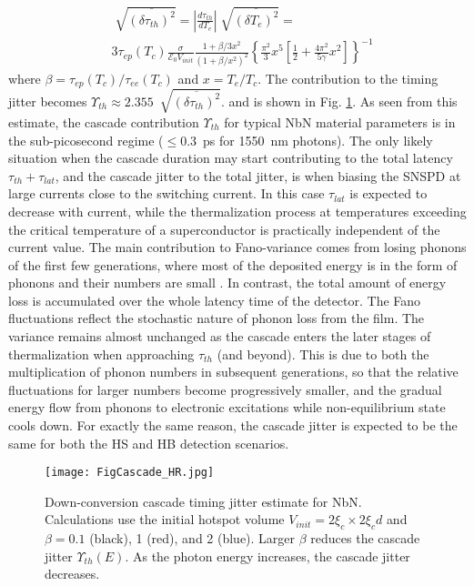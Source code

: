 \documentclass[%
reprint,
 amsmath,amssymb,
aps,
pra,
]{revtex4-1}
\begin{document}
\begin{equation}\label{temperature fluctuations}
\begin{aligned}
&\sqrt[]{\overline{\left(\delta \tau_{th}\right)^2}} = \left|\frac{d\tau_{th}}{dT_e}\right|\sqrt[]{\overline{\left(\delta T_e\right)^2}} = \\
&3\tau_{ep}(T_c)\frac{\sigma}{\mathcal{E}_0 V_{init}}\frac{1 + \beta/3x^2}{\left(1 + \beta/x^2\right)^2}\left\lbrace \frac{\pi^2}{3}x^5\left[\frac{1}{2} + \frac{4 \pi^2}{5 \gamma}x^2\right]\right\rbrace^{-1}
\end{aligned}
\end{equation}
where \(\beta = \tau_{ep}(T_c)/\tau_{ee}(T_c)\) and \(x = T_e/T_c\). The contribution to the timing jitter becomes \(\Upsilon_{th} \approx 2.355~\sqrt[]{\overline{\left(\delta \tau_{th}\right)^2}}\). and is shown in Fig. \ref{F Cascade Jitter}. As seen from this estimate, the cascade contribution \(\Upsilon_{th}\) for typical NbN material parameters is in the sub-picosecond regime (\(\leq 0.3\)~ps for 1550~nm photons).  The only likely situation when the cascade duration may start contributing to the total latency \(\tau_{th} + \tau_{lat}\), and the cascade jitter to the total jitter, is when biasing the SNSPD at large currents close to the switching current.  In this case \(\tau_{lat}\) is expected to decrease with current, while the thermalization process at temperatures exceeding the critical temperature of a superconductor is practically independent of the current value. The main contribution to Fano-variance comes from losing phonons of the first few generations, where most of the deposited energy is in the form of phonons and their numbers are small \cite{kozorezov_fano_2017}. In contrast, the total amount of energy loss is accumulated over the whole latency time of the detector. The Fano fluctuations reflect the stochastic nature of phonon loss from the film.  The variance remains almost unchanged as the cascade enters the later stages of thermalization when approaching \(\tau_{th}\) (and beyond).  This is due to both the multiplication of phonon numbers in subsequent generations, so that the relative fluctuations for larger numbers become progressively smaller, and the gradual energy flow from phonons to electronic excitations while non-equilibrium state cools down.  For exactly the same reason, the cascade jitter is expected to be the same for both the HS and HB detection scenarios.

\begin{figure}
\texttt{[image: FigCascade\_HR.jpg]}
\caption{Down-conversion cascade timing jitter estimate for NbN. Calculations use the initial hotspot volume \(V_{init} = 2\xi_c \times 2\xi_c d\) \cite{vodolazov_single-photon_2017} and \(\beta = 0.1\) (black), 1 (red), and 2 (blue).  Larger \(\beta\) reduces the cascade jitter \(\Upsilon_{th}(E)\). As the photon energy increases, the cascade jitter decreases.
}
\label{F Cascade Jitter}
\end{figure}
\end{document}
